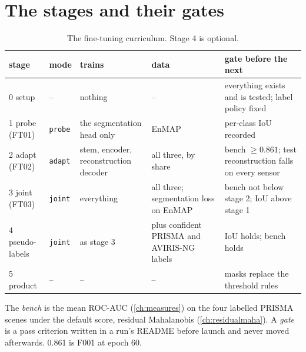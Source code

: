 \section{The stages and their gates}\label{sec:finetune:stages}

\begin{table}[htbp]
\centering\small
\caption{The fine-tuning curriculum. Stage 4 is optional.}
\label{tab:finetune:stages}
\begin{tabular}{p{1.9cm}p{1.1cm}p{2.9cm}p{2.6cm}p{3.9cm}}
\toprule
stage & mode & trains & data & gate before the next\\
\midrule
0 setup & -- & nothing & -- & everything exists and is tested; label policy fixed\\
1 probe (FT01) & \texttt{probe} & the segmentation head only & EnMAP & per-class IoU recorded\\
2 adapt (FT02) & \texttt{adapt} & stem, encoder, reconstruction decoder & all three, by share & bench $\ge 0.861$; test reconstruction falls on every sensor\\
3 joint (FT03) & \texttt{joint} & everything & all three; segmentation loss on EnMAP & bench not below stage 2; IoU above stage 1\\
4 pseudo-labels & \texttt{joint} & as stage 3 & plus confident PRISMA and AVIRIS-NG labels & IoU holds; bench holds\\
5 product & -- & -- & -- & masks replace the threshold rules\\
\bottomrule
\end{tabular}
\end{table}

\begin{definition}
The \emph{bench} is the mean ROC-AUC (\cref{ch:measures}) on the four labelled PRISMA scenes under the default score, residual Mahalanobis
(\cref{ch:residualmaha}). A \emph{gate} is a pass criterion written in a run's README before launch and never moved afterwards. 0.861 is F001 at
epoch 60.
\end{definition}


